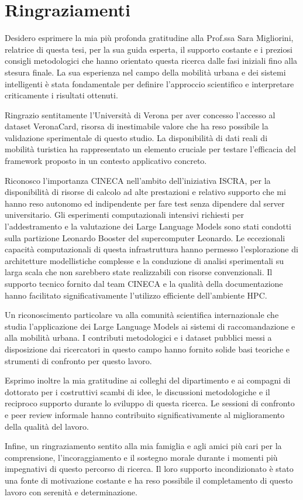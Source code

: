 \section*{Ringraziamenti}

Desidero esprimere la mia più profonda gratitudine alla Prof.ssa Sara Migliorini, relatrice di questa tesi, per la sua guida esperta, il supporto costante e i preziosi consigli metodologici che hanno orientato questa ricerca dalle fasi iniziali fino alla stesura finale. La sua esperienza nel campo della mobilità urbana e dei sistemi intelligenti è stata fondamentale per definire l'approccio scientifico e interpretare criticamente i risultati ottenuti.

Ringrazio sentitamente l'Università di Verona per aver concesso l'accesso al dataset VeronaCard, risorsa di inestimabile valore che ha reso possibile la validazione sperimentale di questo studio. La disponibilità di dati reali di mobilità turistica ha rappresentato un elemento cruciale per testare l'efficacia del framework proposto in un contesto applicativo concreto.

Riconosco l'importanza CINECA nell'ambito dell'iniziativa ISCRA, per la disponibilità di risorse di calcolo ad alte prestazioni e relativo supporto che mi hanno reso autonomo ed indipendente per fare test senza dipendere dal server universitario. Gli esperimenti computazionali intensivi richiesti per l'addestramento e la valutazione dei Large Language Models sono stati condotti sulla partizione Leonardo Booster del supercomputer Leonardo. Le eccezionali capacità computazionali di questa infrastruttura hanno permesso l'esplorazione di architetture modellistiche complesse e la conduzione di analisi sperimentali su larga scala che non sarebbero state realizzabili con risorse convenzionali. Il supporto tecnico fornito dal team CINECA e la qualità della documentazione hanno facilitato significativamente l'utilizzo efficiente dell'ambiente HPC.

Un riconoscimento particolare va alla comunità scientifica internazionale che studia l'applicazione dei Large Language Models ai sistemi di raccomandazione e alla mobilità urbana. I contributi metodologici e i dataset pubblici messi a disposizione dai ricercatori in questo campo hanno fornito solide basi teoriche e strumenti di confronto per questo lavoro.

Esprimo inoltre la mia gratitudine ai colleghi del dipartimento e ai compagni di dottorato per i costruttivi scambi di idee, le discussioni metodologiche e il reciproco supporto durante lo sviluppo di questa ricerca. Le sessioni di confronto e peer review informale hanno contribuito significativamente al miglioramento della qualità del lavoro.

Infine, un ringraziamento sentito alla mia famiglia e agli amici più cari per la comprensione, l'incoraggiamento e il sostegno morale durante i momenti più impegnativi di questo percorso di ricerca. Il loro supporto incondizionato è stato una fonte di motivazione costante e ha reso possibile il completamento di questo lavoro con serenità e determinazione.